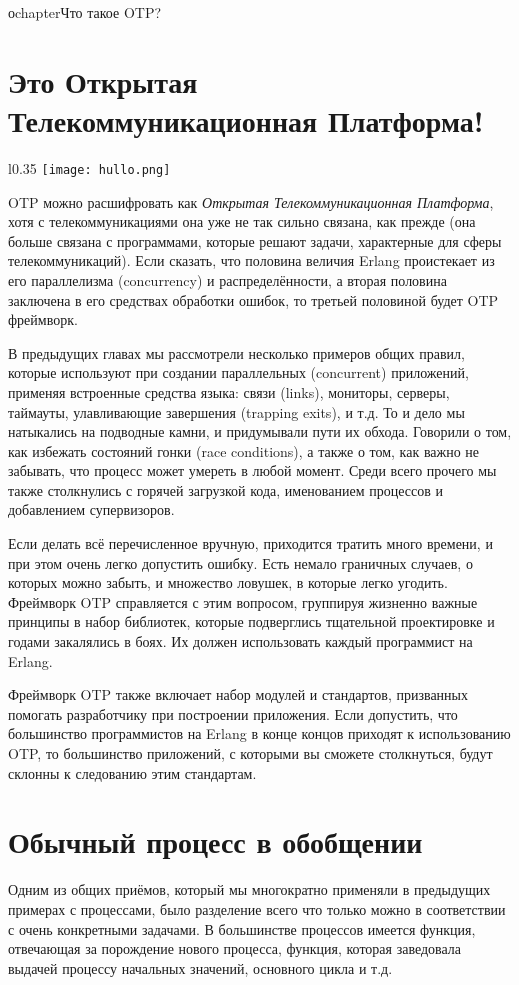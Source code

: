 оchapter{Что такое OTP?}
\label{what-is-otp}
\section{Это Открытая Телекоммуникационная Платформа!}
\label{its-the-open-telecom-platform}

\begin{wrapfigure}{l}{0.35\linewidth}
    \texttt{[image: hullo.png]}
\end{wrapfigure}
OTP можно расшифровать как \emph{Открытая Телекоммуникационная Платформа}, хотя с телекоммуникациями она уже не так сильно связана, как прежде (она больше связана с программами, которые решают задачи, характерные для сферы телекоммуникаций).
Если сказать, что половина величия Erlang проистекает из его параллелизма (concurrency) и распределённости, а вторая половина заключена в его средствах обработки ошибок, то третьей половиной будет OTP фреймворк.

В предыдущих главах мы рассмотрели несколько примеров общих правил, которые используют при создании параллельных (concurrent) приложений, применяя встроенные средства языка: связи (links), мониторы, серверы, таймауты, улавливающие завершения (trapping exits), и т.д.
То и дело мы натыкались на подводные камни, и придумывали пути их обхода.
Говорили о том, как избежать состояний гонки (race conditions), а также о том, как важно не забывать, что процесс может умереть в любой момент.
Среди всего прочего мы также столкнулись с горячей загрузкой кода, именованием процессов и добавлением супервизоров.

Если делать всё перечисленное вручную, приходится тратить много времени, и при этом очень легко допустить ошибку.
Есть немало граничных случаев, о которых можно забыть, и множество ловушек, в которые легко угодить.
Фреймворк OTP справляется с этим вопросом, группируя жизненно важные принципы в набор библиотек, которые подверглись тщательной проектировке и годами закалялись в боях.
Их должен использовать каждый программист на Erlang.

Фреймворк OTP также включает набор модулей и стандартов, призванных помогать разработчику при построении приложения.
Если допустить, что большинство программистов на Erlang в конце концов приходят к использованию OTP, то большинство приложений, с которыми вы сможете столкнуться, будут склонны к следованию этим стандартам. 
\section{Обычный процесс в обобщении}
\label{the-common-process-abstracted}
Одним из общих приёмов, который мы многократно применяли в предыдущих примерах с процессами, было разделение всего что только можно в соответствии с очень конкретными задачами.
В большинстве процессов имеется функция, отвечающая за порождение нового процесса, функция, которая заведовала выдачей процессу начальных значений, основного цикла и т.д.

